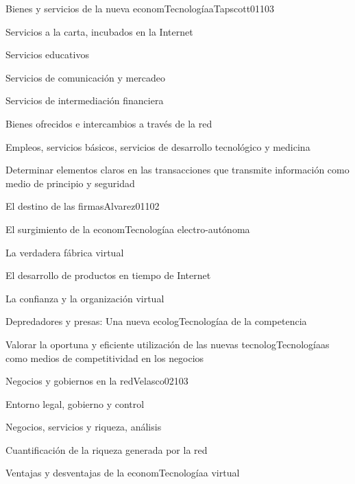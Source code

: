 \begin{syllabus}
\begin{unit}{Bienes y servicios de la nueva economTecnologíaa}{Tapscott01}{10}{3}
   \begin{topics}
      \item Servicios a la carta, incubados en la Internet
	\item Servicios educativos
	\item Servicios de comunicación y mercadeo
	\item Servicios de intermediación financiera
	\item Bienes ofrecidos e intercambios a través de la red
	\item Empleos, servicios básicos, servicios de desarrollo tecnológico y medicina
   \end{topics}

   \begin{unitgoals}
      \item Determinar elementos claros en las transacciones que transmite información como medio de principio y seguridad
   \end{unitgoals}
\end{unit}

\begin{unit}{El destino de las firmas}{Alvarez01}{10}{2}
   \begin{topics}
      \item El surgimiento de la economTecnologíaa electro-autónoma
	\item La verdadera fábrica virtual
	\item El desarrollo de productos en tiempo de Internet
	\item La confianza y la organización virtual
	\item Depredadores y presas: Una nueva ecologTecnologíaa de la competencia
   \end{topics}

   \begin{unitgoals}
      \item Valorar la oportuna y eficiente utilización de las nuevas tecnologTecnologíaas como medios de competitividad en los negocios
   \end{unitgoals}
\end{unit}

\begin{unit}{Negocios y gobiernos en la red}{Velasco02}{10}{3}
   \begin{topics}
      \item Entorno legal, gobierno y control
	\item Negocios, servicios y riqueza, análisis
	\item Cuantificación de la riqueza generada por la red
	\item Ventajas y desventajas de la economTecnologíaa virtual
   \end{topics}


\end{unit}
\end{syllabus}
